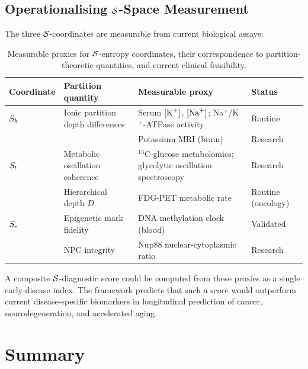 \subsection{Operationalising \texorpdfstring{$\mathcal{S}$}{S}-Space Measurement}
\label{ssec:sspace_measurement}

The three $\mathcal{S}$-coordinates are measurable from current biological assays:

\begin{table}[htbp]
\centering
\caption{Measurable proxies for $\mathcal{S}$-entropy coordinates, their
  correspondence to partition-theoretic quantities, and current clinical
  feasibility.}
\label{tab:sspace_measurement}
\begin{tabular}{llll}
\toprule
Coordinate & Partition quantity & Measurable proxy & Status \\
\midrule
$S_k$ & Ionic partition depth differences & Serum $[\ce{K+}]$, $[\ce{Na+}]$;
         Na$^+$/K$^+$-ATPase activity & Routine \\
      & & Potassium MRI (brain) & Research \\
$S_t$ & Metabolic oscillation coherence & $^{13}$C-glucose metabolomics;
         glycolytic oscillation spectroscopy & Research \\
      & Hierarchical depth $D$ & FDG-PET metabolic rate &
        Routine (oncology) \\
$S_e$ & Epigenetic mark fidelity & DNA methylation clock (blood) &
        Validated \citep{Horvath2013} \\
      & NPC integrity & Nup88 nuclear-cytoplasmic ratio & Research \\
\bottomrule
\end{tabular}
\end{table}

A composite $\mathcal{S}$-diagnostic score could be computed from these proxies
as a single early-disease index. The framework predicts that such a score
would outperform current disease-specific biomarkers in longitudinal prediction
of cancer, neurodegeneration, and accelerated aging.

\section{Summary}
\label{sec:trajectories_summary}

